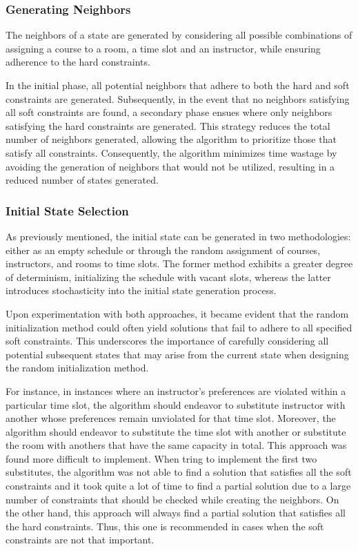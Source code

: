 \documentclass[runningheads]{paper}
\begin{document}
\subsubsection{Generating Neighbors}
The neighbors of a state are generated by considering all possible combinations 
of assigning a course to a room, a time slot and an instructor, while ensuring 
adherence to the hard constraints.

In the initial phase, all potential neighbors that adhere to both the hard and 
soft constraints are generated. Subsequently, in the event that no neighbors 
satisfying all soft constraints are found, a secondary phase ensues where only 
neighbors satisfying the hard constraints are generated. This strategy reduces 
the total number of neighbors generated, allowing the algorithm to prioritize 
those that satisfy all constraints. Consequently, the algorithm minimizes time 
wastage by avoiding the generation of neighbors that would not be utilized, 
resulting in a reduced number of states generated.

\subsubsection{Initial State Selection}
As previously mentioned, the initial state can be generated in two methodologies: either 
as an empty schedule or through the random assignment of courses, instructors, 
and rooms to time slots. The former method exhibits a greater degree of 
determinism, initializing the schedule with vacant slots, whereas the latter 
introduces stochasticity into the initial state generation process.

Upon experimentation with both approaches, it became evident that the random 
initialization method could often yield solutions that fail to adhere to all 
specified soft constraints. This underscores the importance of carefully 
considering all potential subsequent states that may arise from the current 
state when designing the random initialization method.

For instance, in instances where an instructor's preferences are violated within 
a particular time slot, the algorithm should endeavor to substitute instructor with 
another whose preferences remain unviolated for that time slot. Moreover, the 
algorithm should endeavor to substitute the time slot with another or substitute
the room with anothers that have the same capacity in total. This approach
was found more difficult to implement. When tring to implement the first two
substitutes, the algorithm was not able to find a solution that satisfies all the
soft constraints and it took quite a lot of time to find a partial solution due to
a large number of constraints that should be checked while creating the neighbors.
On the other hand, this approach will always find a partial solution that 
satisfies all the hard constraints. Thus, this one is recommended in cases 
when the soft constraints are not that important.
\end{document}
